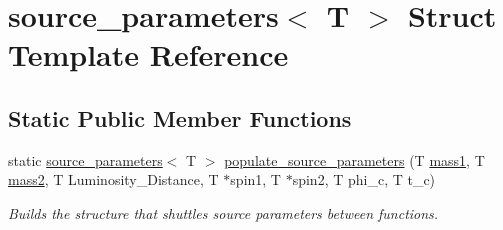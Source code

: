 \hypertarget{structsource__parameters}{}\section{source\+\_\+parameters$<$ T $>$ Struct Template Reference}
\label{structsource__parameters}
\subsection*{Static Public Member Functions}
\begin{DoxyCompactItemize}
\item 
static \hyperlink{structsource__parameters}{source\+\_\+parameters}$<$ T $>$ \hyperlink{structsource__parameters_adb7351bdfa5b400df7feaaa1541e439c}{populate\+\_\+source\+\_\+parameters} (T \hyperlink{structsource__parameters_a1a222ddfbc43359da566d085d92e7b72}{mass1}, T \hyperlink{structsource__parameters_a889d5e8ae96cec656504784f19916b5d}{mass2}, T Luminosity\+\_\+\+Distance, T $\ast$spin1, T $\ast$spin2, T phi\+\_\+c, T t\+\_\+c)
\begin{DoxyCompactList}\small\item\em Builds the structure that shuttles source parameters between functions. \end{DoxyCompactList}\end{DoxyCompactItemize}
